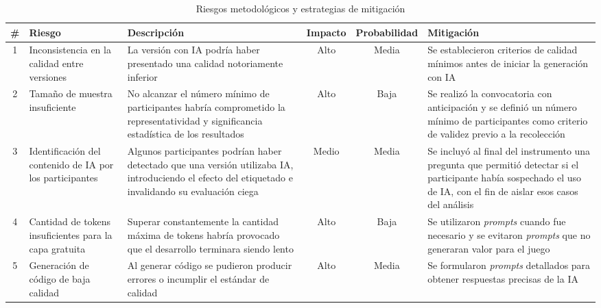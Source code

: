 \begin{table}[H] 
    \centering 
    \caption{Riesgos metodológicos y estrategias de mitigación} 
    \label{tab:riesgos-metodologicos} 
    \begin{tabularx}{\textwidth}{|c|X|X|c|c|X|} 
        \hline 
        \textbf{\#} & 
        \textbf{Riesgo} & 
        \textbf{Descripción} & 
        \textbf{Impacto} & 
        \textbf{Probabilidad} & 
        \textbf{Mitigación} \\ 
        \hline 
        1 & 
        Inconsistencia en la calidad entre versiones & 
        La versión con IA podría haber presentado una calidad notoriamente inferior & 
        Alto & 
        Media & 
        Se establecieron criterios de calidad mínimos antes de iniciar la generación con IA \\ 
        \hline 2 & 
        Tamaño de muestra insuficiente & 
        No alcanzar el número mínimo de participantes habría comprometido la representatividad y significancia estadística de los resultados & 
        Alto & 
        Baja & 
        Se realizó la convocatoria con anticipación y se definió un número mínimo de participantes como criterio de validez previo a la recolección \\ 
        \hline 3 & 
        Identificación del contenido de IA por los participantes &
        Algunos participantes podrían haber detectado que una versión utilizaba IA, introduciendo el efecto del etiquetado e invalidando su evaluación ciega & 
        Medio &
        Media & 
        Se incluyó al final del instrumento una pregunta que permitió detectar si el participante había sospechado el uso de IA, con el fin de aislar esos casos del análisis \\ 
        \hline 4 & 
        Cantidad de tokens insuficientes para la capa gratuita & 
        Superar constantemente la cantidad máxima de tokens habría provocado que el desarrollo terminara siendo lento & Alto & Baja & 
        Se utilizaron \textit{prompts} cuando fue necesario y se evitaron \textit{prompts} que no generaran valor para el juego \\ 
        \hline 5 & 
        Generación de código de baja calidad & 
        Al generar código se pudieron producir errores o incumplir el estándar de calidad & 
        Alto & 
        Media & 
        Se formularon \textit{prompts} detallados para obtener respuestas precisas de la IA \\ 
        \hline 
    \end{tabularx} 
\end{table}

